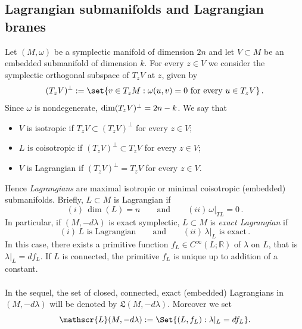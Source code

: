 \documentclass{article}
\newcommand{\1}{\mathbbm{1}}
\theoremstyle{remark}
\begin{document}
\subsection{Lagrangian submanifolds and Lagrangian branes} \label{sezione 23}

\noindent Let $(M,\omega)$ be a symplectic manifold of dimension $2n$ and let $V \subset M$ be an embedded submanifold of dimension $k$. For every $z \in V$ we consider the symplectic orthogonal subspace of $T_zV$ at $z$, given by
$$(T_zV)^{\bot} := \set{ v \in T_zM: \omega(u,v) = 0 \text{ for every } u \in T_zV}\, .$$
Since $\omega$ is nondegenerate, $\textnormal{dim}(T_zV)^{\bot} = 2n -k$. We say that
\begin{itemize}
\item[$(i)$] $V$ is isotropic if $T_zV \subset (T_zV)^{\bot}$ for every $z \in V$;
\item[$(ii)$] $L$ is coisotropic if $(T_zV)^{\bot} \subset T_zV$ for every $z \in V$;
\item[$(iii)$] $V$ is Lagrangian if $(T_zV)^{\bot} = T_zV$ for every $z \in V$.
\end{itemize}
Hence \textit{Lagrangians} are maximal isotropic or minimal coisotropic (embedded) submanifolds. Briefly, $L \subset M$ is Lagrangian if 
$$(i)\, \dim(L) = n \qquad \text{and} \qquad (ii)\, \omega\vert_{TL} = 0 \, .$$
In particular, if $(M,-d\lambda)$ is exact symplectic, $L \subset M$ is \textit{exact Lagrangian} if 
$$(i)\, L \text{ is Lagrangian} \qquad \text{and} \qquad (ii)\, \lambda\vert_{L} \text{ is exact}\, .$$
In this case, there exists a primitive function $f_L \in C^{\infty}(L;\mathbb{R})$ of $\lambda$ on $L$, that is $\lambda\vert_{L} = df_L$.  If $L$ is connected, the primitive $f_L$ is unique up to addition of a constant. \\ \\
\noindent In the sequel, the set of closed, connected, exact (embedded) Lagrangians in $(M, -d\lambda)$ will be denoted by $\mathfrak{L}(M, -d\lambda)$.  Moreover we set
\begin{equation}
    \mathscr{L}(M, -d\lambda) := \Set{(L, f_L): \lambda\vert_{L} = df_L }.
\end{equation}
\end{document}
